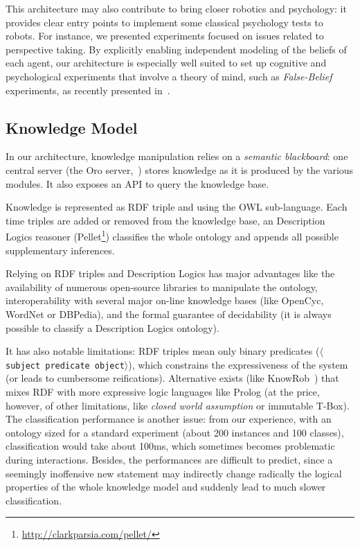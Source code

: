 \documentclass[letterpaper, 10 pt, conference]{ieeeconf}  %
\newcommand{\stmt}[1]{{\footnotesize \tt $\langle$ #1\relax$\rangle$}}
\begin{document}
This architecture may also contribute to bring closer robotics and psychology:
it provides clear entry points to implement some classical psychology tests to
robots. For instance, we presented experiments focused on issues related to
perspective taking. By explicitly enabling independent modeling of the beliefs
of each agent, our architecture is especially well suited to set up cognitive
and psychological experiments that involve a theory of mind, such as
\emph{False-Belief} experiments, as recently presented in~\cite{Warnier2012a}.

\subsection{Knowledge Model}

In our architecture, knowledge manipulation relies on a \emph{semantic
blackboard}: one central server (the {\sc Oro} server,~\cite{Lemaignan2010})
stores knowledge as it is produced by the various modules. It also exposes an
API to query the knowledge base.

Knowledge is represented as RDF triple and using the OWL sub-language. Each
time triples are added or removed from the knowledge base, an Description
Logics reasoner (Pellet\footnote{\url{http://clarkparsia.com/pellet/}})
classifies the whole ontology and appends all possible supplementary
inferences.

Relying on RDF triples and Description Logics has major advantages like
the availability of numerous open-source libraries to manipulate the ontology, interoperability with several major on-line knowledge bases (like {\sc OpenCyc}, {\sc WordNet} or {\sc
DBPedia}), and the formal guarantee of decidability (it is always possible to classify a Description Logics ontology).

It has also notable limitations: RDF triples mean only binary predicates
(\stmt{subject predicate object}), which constrains the expressiveness of
the system (or leads to cumbersome reifications). Alternative exists (like {\sc
KnowRob}~\cite{Tenorth2009a}) that mixes RDF with more expressive logic
languages like {\sc Prolog} (at the price, however, of other limitations, like
\emph{closed world assumption} or immutable T-Box). The classification
performance is another issue: from our experience, with an ontology sized for a
standard experiment (about 200 instances and 100 classes), classification would
take about 100ms, which sometimes becomes problematic during interactions.
Besides, the performances are difficult to predict, since a seemingly
inoffensive new statement may indirectly change radically the logical
properties of the whole knowledge model and suddenly lead to much slower
classification.
\end{document}
